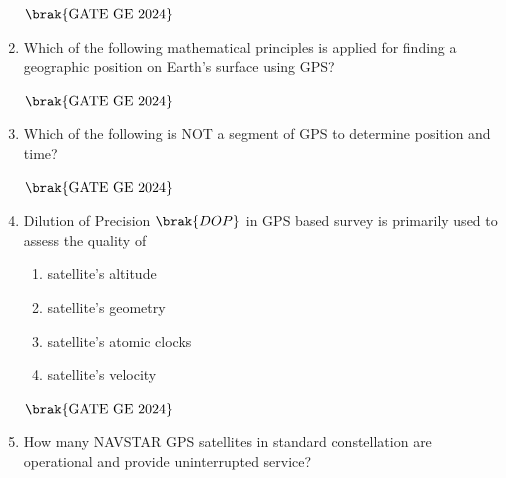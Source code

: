 \documentclass[journal,12pt,onecolumn]{IEEEtran}
\theoremstyle{remark}
\begin{document}
\begin{enumerate}
\begin{enumerate}
\end{enumerate}
\hfill $\brak{\text{GATE GE 2024}}$
\bigskip
\item Which 
of the following mathematical principles is applied for finding a geographic position on Earth's surface using GPS?
\begin{enumerate}
\end{enumerate}
\hfill $\brak{\text{GATE GE 2024}}$
\bigskip
\item Which of the following is NOT a segment of GPS to determine position and time?
\begin{enumerate}
\end{enumerate}
\hfill $\brak{\text{GATE GE 2024}}$
\bigskip
\item Dilution of Precision $\brak{DOP}$ in GPS based survey is primarily used to assess the quality of
\begin{enumerate}
\item satellite's altitude
\item satellite's geometry
\item satellite's atomic clocks
\item satellite's velocity
\end{enumerate}
\hfill $\brak{\text{GATE GE 2024}}$
\bigskip
\item How many NAVSTAR GPS satellites in standard constellation are operational and provide uninterrupted service?
\begin{enumerate}
\end{enumerate}
\end{enumerate}
\end{document}
